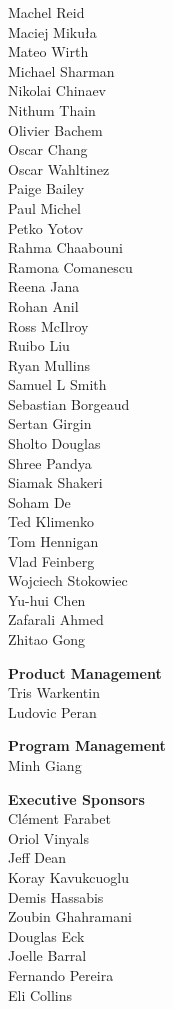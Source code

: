 Machel Reid \\
Maciej Mikuła \\
Mateo Wirth \\
Michael Sharman \\
Nikolai Chinaev \\
Nithum Thain \\
Olivier Bachem \\
Oscar Chang \\
Oscar Wahltinez \\
Paige Bailey \\
Paul Michel \\
Petko Yotov \\
Rahma Chaabouni \\
Ramona Comanescu  \\
Reena Jana \\
Rohan Anil \\
Ross McIlroy \\
Ruibo Liu \\
Ryan Mullins \\
Samuel L Smith \\
Sebastian Borgeaud \\
Sertan Girgin \\
Sholto Douglas \\
Shree Pandya \\
Siamak Shakeri \\
Soham De \\
Ted Klimenko \\
Tom Hennigan \\
Vlad Feinberg \\
Wojciech Stokowiec \\
Yu-hui Chen \\
Zafarali Ahmed \\
Zhitao Gong

\pagebreak
\noindent\textbf{Product Management} \\
Tris Warkentin \\
Ludovic Peran

\noindent\textbf{Program Management} \\
Minh Giang

\noindent\textbf{Executive Sponsors} \\
Clément Farabet \\
Oriol Vinyals \\
Jeff Dean \\
Koray Kavukcuoglu \\
Demis Hassabis \\
Zoubin Ghahramani \\
Douglas Eck \\
Joelle Barral \\
Fernando Pereira \\
Eli Collins

